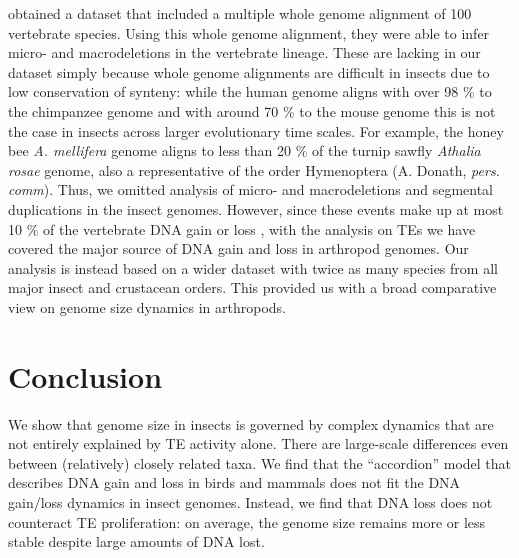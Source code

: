 \citet{Kapusta2017a} obtained a dataset that included a multiple whole
genome alignment of 100 vertebrate species. Using this whole genome
alignment, they were able to infer micro- and macrodeletions in the
vertebrate lineage. These are lacking in our dataset simply because
whole genome alignments are difficult in insects due to low conservation
of synteny: while the human genome aligns with over 98 \% to the
chimpanzee genome and with around 70 \% to the mouse genome
\cite{Mural2002} this is not the case in insects across larger
evolutionary time scales. For example, the honey bee \emph{A. mellifera}
genome aligns to less than 20 \% of the turnip sawfly \emph{Athalia
rosae} genome, also a representative of the order Hymenoptera (A.
Donath, \emph{pers. comm}). Thus, we omitted analysis of micro- and
macrodeletions and segmental duplications in the insect genomes.
However, since these events make up at most 10 \% of the vertebrate DNA
gain or loss \citep{Kapusta2017a}, with the analysis on TEs we have
covered the major source of DNA gain and loss in arthropod genomes. Our
analysis is instead based on a wider dataset with twice as many species
from all major insect and crustacean orders. This provided us with a
broad comparative view on genome size dynamics in arthropods.

\section{Conclusion}\label{conclusion}

We show that genome size in insects is governed by complex dynamics that
are not entirely explained by TE activity alone. There are large-scale
differences even between (relatively) closely related taxa. We find that
the ``accordion'' model that describes DNA gain and loss in birds and
mammals \citep{Kapusta2017a} does not fit the DNA gain/loss dynamics in
insect genomes. Instead, we find that DNA loss does not counteract TE
proliferation: on average, the genome size remains more or less stable
despite large amounts of DNA lost.




